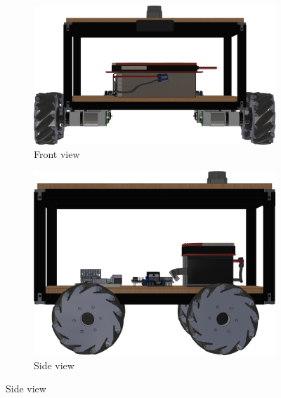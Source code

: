 \begin{figure}[H]
  \begin{subfigure}[b]{0.3\textwidth}
    \centering
    \includegraphics[width=\textwidth]{imgs/front.png}
    \caption{Front view}
    \label{fig:robot_front}
  \end{subfigure}
  \hfill
  \begin{subfigure}[b]{0.3\textwidth}
    \centering
    \includegraphics[width=\textwidth]{imgs/side.png}
    \caption{Side view}
    \label{fig:robot_side}
  \end{subfigure}

  \vspace{0em}


\end{figure}
